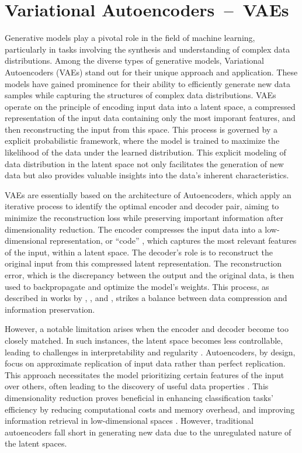 \section{Variational Autoencoders~--~VAEs}\label{VAEs}

Generative models play a pivotal role in the field of machine learning, particularly in tasks involving the synthesis and understanding of complex data distributions. Among the diverse types of generative models, Variational Autoencoders (VAEs) stand out for their unique approach and application. These models have gained prominence for their ability to efficiently generate new data samples while capturing the structures of complex data distributions. VAEs operate on the principle of encoding input data into a latent space, a compressed representation of the input data containing only the most imporant features, and then reconstructing the input from this space. This process is governed by a explicit probabilistic framework, where the model is trained to maximize the likelihood of the data under the learned distribution. This explicit modeling of data distribution in the latent space not only facilitates the generation of new data but also provides valuable insights into the data’s inherent characteristics. 

VAEs are essentially based on the architecture of Autoencoders, which apply an iterative process to identify the optimal encoder and decoder pair, aiming to minimize the reconstruction loss while preserving important information after dimensionality reduction. The encoder compresses the input data into a low-dimensional representation, or ``code'' \citep{hintonCode, GoodfellowDeepLearning}, which captures the most relevant features of the input, within a latent space. The decoder's role is to reconstruct the original input from this compressed latent representation. The reconstruction error, which is the discrepancy between the output and the original data, is then used to backpropagate and optimize the model's weights. This process, as described in works by \citeauthor{hintonCode}, \citeauthor{GoodfellowDeepLearning}, and \citeauthor{michelucci2022introduction}, strikes a balance between data compression and information preservation.

However, a notable limitation arises when the encoder and decoder become too closely matched. In such instances, the latent space becomes less controllable, leading to challenges in interpretability and regularity \citep{michelucci2022introduction}. Autoencoders, by design, focus on approximate replication of input data rather than perfect replication. This approach necessitates the model prioritizing certain features of the input over others, often leading to the discovery of useful data properties \citep{GoodfellowDeepLearning}. This dimensionality reduction proves beneficial in enhancing classification tasks' efficiency by reducing computational costs and memory overhead, and improving information retrieval in low-dimensional spaces \citep{GoodfellowDeepLearning}. However, traditional autoencoders fall short in generating new data due to the unregulated nature of the latent spaces.

